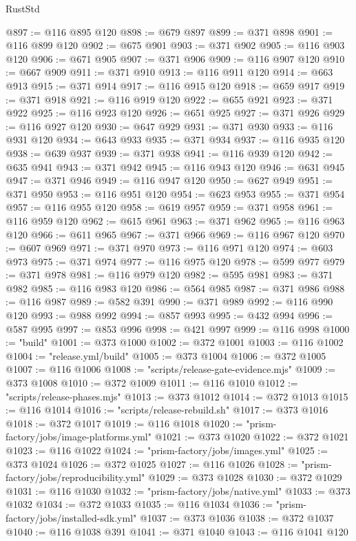 \begin{lexlean}{RustStd}
\begin{coremodule}
@897 := @116 @895 @120
@898 := @679 @897
@899 := @371 @898
@901 := @116 @899 @120
@902 := @675 @901
@903 := @371 @902
@905 := @116 @903 @120
@906 := @671 @905
@907 := @371 @906
@909 := @116 @907 @120
@910 := @667 @909
@911 := @371 @910
@913 := @116 @911 @120
@914 := @663 @913
@915 := @371 @914
@917 := @116 @915 @120
@918 := @659 @917
@919 := @371 @918
@921 := @116 @919 @120
@922 := @655 @921
@923 := @371 @922
@925 := @116 @923 @120
@926 := @651 @925
@927 := @371 @926
@929 := @116 @927 @120
@930 := @647 @929
@931 := @371 @930
@933 := @116 @931 @120
@934 := @643 @933
@935 := @371 @934
@937 := @116 @935 @120
@938 := @639 @937
@939 := @371 @938
@941 := @116 @939 @120
@942 := @635 @941
@943 := @371 @942
@945 := @116 @943 @120
@946 := @631 @945
@947 := @371 @946
@949 := @116 @947 @120
@950 := @627 @949
@951 := @371 @950
@953 := @116 @951 @120
@954 := @623 @953
@955 := @371 @954
@957 := @116 @955 @120
@958 := @619 @957
@959 := @371 @958
@961 := @116 @959 @120
@962 := @615 @961
@963 := @371 @962
@965 := @116 @963 @120
@966 := @611 @965
@967 := @371 @966
@969 := @116 @967 @120
@970 := @607 @969
@971 := @371 @970
@973 := @116 @971 @120
@974 := @603 @973
@975 := @371 @974
@977 := @116 @975 @120
@978 := @599 @977
@979 := @371 @978
@981 := @116 @979 @120
@982 := @595 @981
@983 := @371 @982
@985 := @116 @983 @120
@986 := @564 @985
@987 := @371 @986
@988 := @116 @987
@989 := @582 @391
@990 := @371 @989
@992 := @116 @990 @120
@993 := @988 @992
@994 := @857 @993
@995 := @432 @994
@996 := @587 @995
@997 := @853 @996
@998 := @421 @997
@999 := @116 @998
@1000 := "build"
@1001 := @373 @1000
@1002 := @372 @1001
@1003 := @116 @1002
@1004 := "release.yml/build"
@1005 := @373 @1004
@1006 := @372 @1005
@1007 := @116 @1006
@1008 := "scripts/release-gate-evidence.mjs"
@1009 := @373 @1008
@1010 := @372 @1009
@1011 := @116 @1010
@1012 := "scripts/release-phases.mjs"
@1013 := @373 @1012
@1014 := @372 @1013
@1015 := @116 @1014
@1016 := "scripts/release-rebuild.sh"
@1017 := @373 @1016
@1018 := @372 @1017
@1019 := @116 @1018
@1020 := "prism-factory/jobs/image-platforms.yml"
@1021 := @373 @1020
@1022 := @372 @1021
@1023 := @116 @1022
@1024 := "prism-factory/jobs/images.yml"
@1025 := @373 @1024
@1026 := @372 @1025
@1027 := @116 @1026
@1028 := "prism-factory/jobs/reproducibility.yml"
@1029 := @373 @1028
@1030 := @372 @1029
@1031 := @116 @1030
@1032 := "prism-factory/jobs/native.yml"
@1033 := @373 @1032
@1034 := @372 @1033
@1035 := @116 @1034
@1036 := "prism-factory/jobs/installed-sdk.yml"
@1037 := @373 @1036
@1038 := @372 @1037
@1040 := @116 @1038 @391
@1041 := @371 @1040
@1043 := @116 @1041 @120

\end{coremodule}
\end{lexlean}
